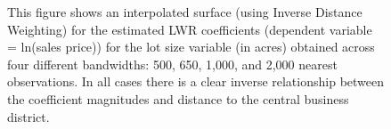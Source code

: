 \documentclass{article}\usepackage{graphicx, color}
\begin{document}
\begin{figure}
 \caption{This figure shows an interpolated surface (using Inverse Distance Weighting) for the estimated LWR coefficients (dependent variable = ln(sales price)) for the lot size variable (in acres) obtained across four different bandwidths: 500, 650, 1,000, and 2,000 nearest observations. In all cases there is a clear inverse relationship between the coefficient magnitudes and distance to the central business district.}
 \label{fig:AcreBetas}
\end{figure}
\end{document}
